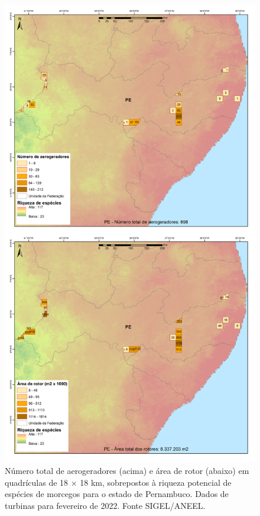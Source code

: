 \documentclass[
  oneside]{scrbook}
\begin{document}
\begin{figure}[H]

{\centering \includegraphics[width=0.75\linewidth]{imagens/cap09/Figura_9.10} 

}

\caption{Número total de aerogeradores (acima) e área de rotor (abaixo) em quadrículas de 18 × 18 km, sobrepostos à riqueza potencial de espécies de morcegos para o estado de Pernambuco. Dados de turbinas para fevereiro de 2022. Fonte SIGEL/ANEEL.}\label{fig:75}
\end{figure}
\end{document}
